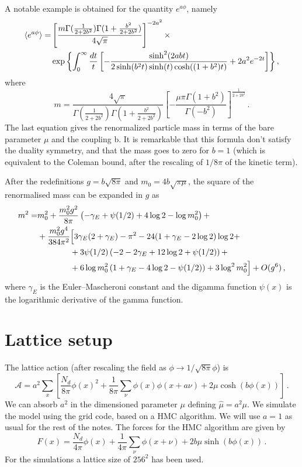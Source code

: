 \documentclass[12pt,a4paper]{report}
\begin{document}
   A notable example is obtained for the quantity $e^{a\phi}$, namely
\begin{align}
\braket{e^{a \phi}} =  &\left[ \dfrac{m\Gamma(\frac{1}{2+2b^2}) \Gamma(1+ \frac{b^2}{2+2b^2}) }{4 \sqrt{\pi}}  \right]^{-2 a^2} \times  \\ & \exp{\left\lbrace \int_0^\infty \dfrac{dt}{t} \left[ - \dfrac{\sinh^2(2 a b t)}{2 \sinh(b^2t) \sinh(t)\cosh((1+b^2)t) } + 2 a^2 e^{-2t} \right]  \right\rbrace } \nonumber \,,
\end{align} where \begin{equation}
\label{eq:mass_continuum}
m = \dfrac{4 \sqrt{\pi}}{\Gamma(\frac{1}{2+2b^2})\Gamma(1 +\frac{b^2}{2+2b^2}) } \left[ - \dfrac{\mu \pi \Gamma(1+b^2)}{\Gamma(-b^2)} \right]^{\frac{1}{2+2b^2}} \,.
\end{equation} The last equation gives the renormalized particle mass in terms of the bare parameter $\mu$ and the coupling b. It is remarkable that this formula don't satisfy the duality symmetry, and that the mass goes to zero for $b=1$ (which is equivalent to the Coleman bound, after the rescaling of $1/8\pi$ of the kinetic term).

After the redefinitions $g=b\sqrt{8\pi}$ and $m_0=4b\sqrt{\pi\mu}$, the square of the renormalised mass can be expanded in $g$ as
\begin{align}
\label{eq:exactrenormalisedmassexpansion}
m^2=&m_0^2+\frac{m_0^2g^2}{8\pi}\left(
-\gamma_E+\psi(1/2) +4 \log 2-\log m_0^2
\right)+\notag\\
&+\frac{m_0^2g^4}{384\pi^2}\Big[
3\gamma_E(2+\gamma_E)-\pi^2-24(1+\gamma_E-2\log 2)\log 2+\notag\\
&\qquad\qquad+3\psi(1/2)\left(-2-2\gamma_E+12\log 2+\psi(1/2)\right)+\notag\\
&\qquad\qquad+6\log m_0^2\left(1+\gamma_E-4\log 2-\psi(1/2)\right)+3\log^2m_0^2
\Big]+O(g^6)\,,
\end{align}
where $\gamma_E$ is the Euler–Mascheroni constant and the digamma function $\psi(x)$ is the logarithmic derivative of the gamma function.


\chapter{Lattice setup}
\label{sec:lattice_setup}
The lattice action (after rescaling the field as $\phi \to 1/\sqrt{8 \pi} \phi $) is \begin{equation}
\mathcal{A} = a^2 \sum_x \left[ \dfrac{N_d}{8 \pi} \phi(x)^2 + \dfrac{1}{8\pi} \sum_\nu \phi(x) \phi(x+ a \nu) +2  \mu \cosh(b\phi(x)) \right] \,.
\end{equation} We can absorb $a^2$ in the dimensioned parameter $\mu$ defining $\hat \mu = a^2 \mu$. We simulate the model using the grid code, based on a HMC algorithm. We will use $a=1$ as usual for the rest of the notes.
The forces for the HMC algorithm are given by \begin{equation}
F(x) = \dfrac{N_d}{4 \pi} \phi(x) + \dfrac{1}{4 \pi} \sum_{\nu}\phi(x+ \nu) + 2 b \mu \sinh(b\phi(x)) \,.
\end{equation} For the simulations a lattice size of $256^2$ has been used.
\end{document}

